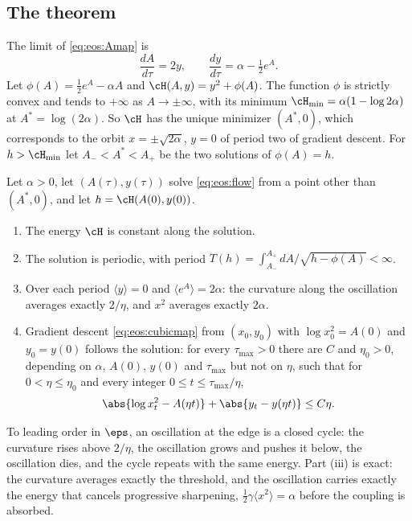 \begin{refsection}
\subsection{The theorem}

The limit of \eqref{eq:eos:Amap} is
\begin{equation}\label{eq:eos:flow}
  \frac{dA}{d\tau}=2y,\qquad \frac{dy}{d\tau}=\alpha-\tfrac12e^{A}.
\end{equation}
Let $\phi(A)=\frac12e^A-\alpha A$ and $\cH(A,y)=y^2+\phi(A)$. The function $\phi$ is strictly convex and tends to $+\infty$ as $A\to\pm\infty$, with its minimum $\eosHmin=\alpha(1-\log2\alpha)$ at $A^*=\log(2\alpha)$. So $\cH$ has the unique minimizer $(A^*,0)$, which corresponds to the orbit $x=\pm\sqrt{2\alpha}$, $y=0$ of period two of gradient descent. For $h>\eosHmin$ let $A_-<A^*<A_+$ be the two solutions of $\phi(A)=h$.

\begin{theorem}\label{thm:eos:selfstab}
Let $\alpha>0$, let $(A(\tau),y(\tau))$ solve \eqref{eq:eos:flow} from a point other than $(A^*,0)$, and let $h=\cH(A(0),y(0))$.
\begin{enumerate}
\item The energy $\cH$ is constant along the solution.
\item The solution is periodic, with period $T(h)=\int_{A_-}^{A_+}dA/\sqrt{h-\phi(A)}<\infty$.
\item Over each period $\langle y\rangle=0$ and $\langle e^A\rangle=2\alpha$: the curvature along the oscillation averages exactly $2/\eta$, and $x^2$ averages exactly $2\alpha$.
\item Gradient descent \eqref{eq:eos:cubicmap} from $(x_0,y_0)$ with $\log x_0^2=A(0)$ and $y_0=y(0)$ follows the solution: for every $\tau_{\max}>0$ there are $C$ and $\eta_0>0$, depending on $\alpha$, $A(0)$, $y(0)$ and $\tau_{\max}$ but not on $\eta$, such that for $0<\eta\le\eta_0$ and every integer $0\le t\le\tau_{\max}/\eta$,
\[
  \abs{\log x_t^2-A(\eta t)}+\abs{y_t-y(\eta t)}\le C\eta .
\]
\end{enumerate}
\end{theorem}

To leading order in $\eps$, an oscillation at the edge is a closed cycle: the curvature rises above $2/\eta$, the oscillation grows and pushes it below, the oscillation dies, and the cycle repeats with the same energy. Part (iii) is exact: the curvature averages exactly the threshold, and the oscillation carries exactly the energy that cancels progressive sharpening, $\frac12\gamma\langle x^2\rangle=\alpha$ before the coupling is absorbed.


\end{refsection}
